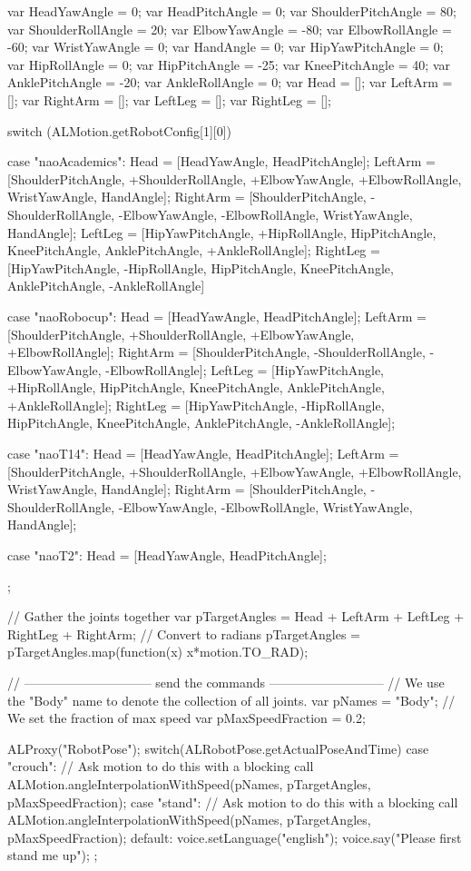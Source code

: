 \begin{urbiunchecked}
var HeadYawAngle       = 0;
var HeadPitchAngle     = 0;
var ShoulderPitchAngle = 80;
var ShoulderRollAngle  = 20;
var ElbowYawAngle      = -80;
var ElbowRollAngle     = -60;
var WristYawAngle      = 0;
var HandAngle          = 0;
var HipYawPitchAngle   = 0;
var HipRollAngle       = 0;
var HipPitchAngle      = -25;
var KneePitchAngle     = 40;
var AnklePitchAngle    = -20;
var AnkleRollAngle     = 0;
var Head = [];
var LeftArm = [];
var RightArm = [];
var LeftLeg = [];
var RightLeg = [];

switch (ALMotion.getRobotConfig[1][0])
{
  case "naoAcademics":
    Head     = [HeadYawAngle, HeadPitchAngle];
    LeftArm  = [ShoulderPitchAngle, +ShoulderRollAngle,
                +ElbowYawAngle, +ElbowRollAngle, WristYawAngle, HandAngle];
    RightArm = [ShoulderPitchAngle, -ShoulderRollAngle,
                -ElbowYawAngle, -ElbowRollAngle, WristYawAngle, HandAngle];
    LeftLeg  = [HipYawPitchAngle, +HipRollAngle,
                HipPitchAngle, KneePitchAngle, AnklePitchAngle, +AnkleRollAngle];
    RightLeg = [HipYawPitchAngle, -HipRollAngle,
                HipPitchAngle, KneePitchAngle, AnklePitchAngle, -AnkleRollAngle]

  case "naoRobocup":
    Head     = [HeadYawAngle, HeadPitchAngle];
    LeftArm  = [ShoulderPitchAngle, +ShoulderRollAngle,
                +ElbowYawAngle, +ElbowRollAngle];
    RightArm = [ShoulderPitchAngle, -ShoulderRollAngle,
                -ElbowYawAngle, -ElbowRollAngle];
    LeftLeg  = [HipYawPitchAngle, +HipRollAngle,
                HipPitchAngle, KneePitchAngle, AnklePitchAngle, +AnkleRollAngle];
    RightLeg = [HipYawPitchAngle, -HipRollAngle,
                HipPitchAngle, KneePitchAngle, AnklePitchAngle, -AnkleRollAngle];

  case "naoT14":
    Head     = [HeadYawAngle, HeadPitchAngle];
    LeftArm  = [ShoulderPitchAngle, +ShoulderRollAngle,
                +ElbowYawAngle, +ElbowRollAngle, WristYawAngle, HandAngle];
    RightArm = [ShoulderPitchAngle, -ShoulderRollAngle,
                -ElbowYawAngle, -ElbowRollAngle, WristYawAngle, HandAngle];

  case "naoT2":
    Head     = [HeadYawAngle, HeadPitchAngle];
};

// Gather the joints together
var pTargetAngles = Head + LeftArm + LeftLeg + RightLeg + RightArm;
// Convert to radians
pTargetAngles = pTargetAngles.map(function(x) {x*motion.TO_RAD});


// ------------------------------ send the commands ---------------------------
// We use the "Body" name to denote the collection of all joints.
var pNames = "Body";
// We set the fraction of max speed
var pMaxSpeedFraction = 0.2;

ALProxy("RobotPose");
switch(ALRobotPose.getActualPoseAndTime)
{
  case "crouch":
    // Ask motion to do this with a blocking call
    ALMotion.angleInterpolationWithSpeed(pNames, pTargetAngles, pMaxSpeedFraction);
  case "stand":
    // Ask motion to do this with a blocking call
    ALMotion.angleInterpolationWithSpeed(pNames, pTargetAngles, pMaxSpeedFraction);
  default:
    voice.setLanguage("english");
    voice.say("Please first stand me up");
};
\end{urbiunchecked}

